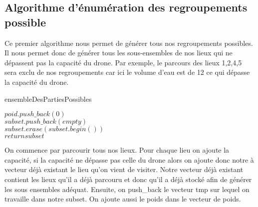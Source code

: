 \documentclass[a4paper,sffamily,12pt]{article}
\begin{document}
		\subsection{Algorithme d'énumération des regroupements possible}
			
			\vspace{0.5cm}

				Ce premier algorithme nous permet de générer tous nos regroupements possibles. Il nous permet donc de générer tous les sous-ensembles de nos lieux qui ne dépassent pas la capacité du drone. Par exemple, le parcours des lieux 1,2,4,5 sera exclu de nos regroupements car ici le volume d'eau est de 12 ce qui dépasse la capacité du drone.

			\newpage 

			\IncMargin{1em}
			\begin{algorithm}
				\caption{ensembleDesPartiesPossibles}				
				\BlankLine
				$poid.push\_back(0)$\\
				$subset.push\_back(empty)$\\
				$subset.erase(subset.begin())$\\
				$return subset$ \\
			\end{algorithm}\DecMargin{1em}

				On commence par parcourir tous nos lieux. Pour chaque lieu on ajoute la capacité, si la capacité ne dépasse pas celle du drone alors on ajoute donc notre à vecteur déjà existant le lieu qu'on vient de visiter. Notre vecteur déjà existant contient les lieux qu'il a déjà parcouru et donc qu'il a déjà stocké afin de générer les sous ensembles adéquat. Ensuite, on push\_back le vecteur tmp sur lequel on travaille dans notre subset. On ajoute aussi le poids dans le vecteur de poids.\\
						
\end{document}
